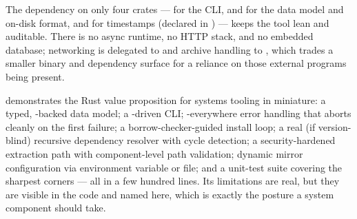 The dependency on only four crates ---  for the CLI,  and  for the data model and on-disk format, and  for timestamps (declared in ) --- keeps the tool lean and auditable. There is no async runtime, no HTTP stack, and no embedded database; networking is delegated to  and archive handling to , which trades a smaller binary and dependency surface for a reliance on those external programs being present.

\begin{infobox}
 demonstrates the Rust value proposition for systems tooling in miniature: a typed, -backed data model; a -driven CLI; -everywhere error handling that aborts cleanly on the first failure; a borrow-checker-guided install loop; a real (if version-blind) recursive dependency resolver with cycle detection; a security-hardened extraction path with component-level path validation; dynamic mirror configuration via environment variable or file; and a unit-test suite covering the sharpest corners --- all in a few hundred lines. Its limitations are real, but they are visible in the code and named here, which is exactly the posture a system component should take.
\end{infobox}
